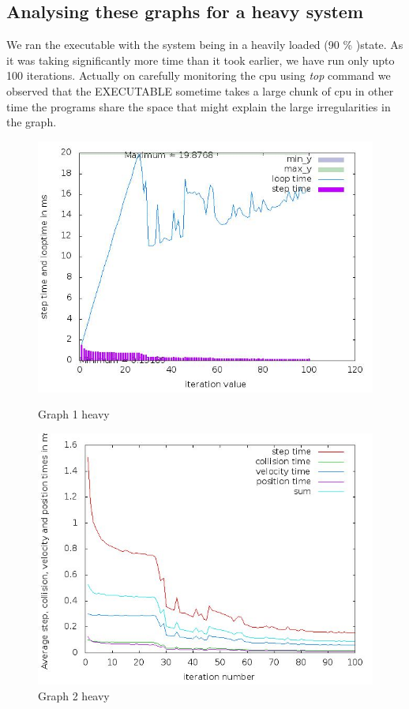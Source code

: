\documentclass[11pt]{article}
\begin{document}
\subsection*{Analysing these graphs for a heavy system}
We ran the executable with the system being in a heavily loaded (90 \% )state. As it was taking significantly more time than it took earlier,
we have run only upto 100 iterations.
Actually on carefully monitoring the cpu using {\it top} command we observed  that the EXECUTABLE sometime takes a large chunk of cpu in other time the programs share the space that might explain the large irregularities in the graph.
\begin{figure}
\begin{minipage}{.5\textwidth}
\includegraphics[scale=0.35]{./images/plot1heavy.png}
\caption{Graph 1 heavy}
\end{minipage}
\begin{minipage}{.5\textwidth}
\includegraphics[scale=0.35]{./images/plot2heavy.png}
\caption{Graph 2 heavy}
\end{minipage}
\end{figure}
\end{document}
